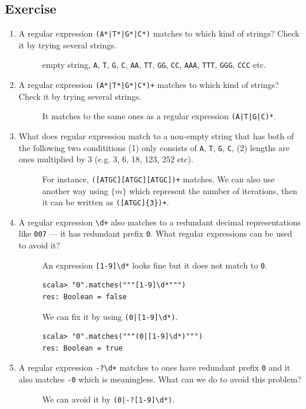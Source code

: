 \documentclass[11pt]{article}
\begin{document}
\subsection{Exercise}
\label{sec:orgheadline2}
\begin{enumerate}
\item A regular expression \texttt{(A*|T*|G*|C*)}  matches to which kind of
strings? Check it by trying several strings. 
\begin{description}
\item[{}] empty string, \texttt{A}, \texttt{T}, \texttt{G}, \texttt{C}, \texttt{AA}, \texttt{TT}, \texttt{GG}, \texttt{CC}, \texttt{AAA}, \texttt{TTT}, \texttt{GGG}, \texttt{CCC} etc.
\end{description}
\item A regular expression  \texttt{(A*|T*|G*|C*)+} matches to which kind of 
strings? Check it by trying several strings. 
\begin{description}
\item[{}] It matches to the same ones as a regular expression \texttt{(A|T|G|C)*}.
\end{description}
\item What does regular expression match to a non-empty string that has
both of the following two condititions (1) only consists of \texttt{A}, \texttt{T}, \texttt{G}, \texttt{C},
(2) lengths are ones multiplied by 3 (e.g. 3, 6, 18, 123, 252 etc). 
\begin{description}
\item[{}] For instance, \texttt{([ATGC][ATGC][ATGC])+} matches. 
We can also use another way using \(\{m\}\) which represent the 
number of iterations, then it can be written as \texttt{([ATGC]\{3\})+}.
\end{description}
\item A regular expression \texttt{\textbackslash{}d+} also matches to a redundant decimal 
representations like \texttt{007} --- it has redundant prefix
\texttt{0}. What regular expressions can be used to avoid it?
\begin{description}
\item[{}] An expression \texttt{[1-9]\textbackslash{}d*} looks fine but it does not match to \texttt{0}.
\begin{verbatim}
scala> "0".matches("""[1-9]\d*""")
res: Boolean = false
\end{verbatim}
We can fix it by using \texttt{(0|[1-9]\textbackslash{}d*)}.
\begin{verbatim}
scala> "0".matches("""(0|[1-9]\d*)""")
res: Boolean = true
\end{verbatim}
\end{description}
\item A regular expression  \texttt{-?\textbackslash{}d+} matches to ones have redundant prefix
\texttt{0} and it also matches \texttt{-0} which is meaningless. 
What can we do to avoid this problem?
\begin{description}
\item[{}] We can avoid it by \texttt{(0|-?[1-9]\textbackslash{}d*)}.
\end{description}
\end{enumerate}
\end{document}
